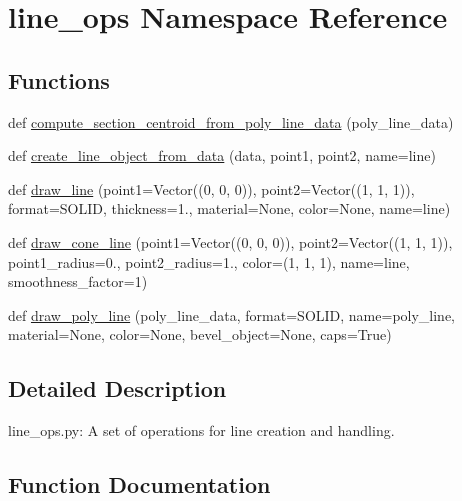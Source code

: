 \hypertarget{namespaceline__ops}{}\section{line\+\_\+ops Namespace Reference}
\label{namespaceline__ops}
\subsection*{Functions}
\begin{DoxyCompactItemize}
\item 
def \hyperlink{namespaceline__ops_a1c1e6d2c47476f9e0f4efad0660ca32c}{compute\+\_\+section\+\_\+centroid\+\_\+from\+\_\+poly\+\_\+line\+\_\+data} (poly\+\_\+line\+\_\+data)
\item 
def \hyperlink{namespaceline__ops_aa28100a7aaa999c79143eef61d9f04e3}{create\+\_\+line\+\_\+object\+\_\+from\+\_\+data} (data, point1, point2, name=\textquotesingle{}line\textquotesingle{})
\item 
def \hyperlink{namespaceline__ops_aaffad18467b48ace39bf92fa9a7ff2ce}{draw\+\_\+line} (point1=Vector((0, 0, 0)), point2=Vector((1, 1, 1)), format=\textquotesingle{}S\+O\+L\+ID\textquotesingle{}, thickness=1., material=None, color=None, name=\textquotesingle{}line\textquotesingle{})
\item 
def \hyperlink{namespaceline__ops_af11269b33e46b7eb141d9583e75001eb}{draw\+\_\+cone\+\_\+line} (point1=Vector((0, 0, 0)), point2=Vector((1, 1, 1)), point1\+\_\+radius=0., point2\+\_\+radius=1., color=(1, 1, 1), name=\textquotesingle{}line\textquotesingle{}, smoothness\+\_\+factor=1)
\item 
def \hyperlink{namespaceline__ops_aab5a8673f145eb5e729faeb5d0b0a521}{draw\+\_\+poly\+\_\+line} (poly\+\_\+line\+\_\+data, format=\textquotesingle{}S\+O\+L\+ID\textquotesingle{}, name=\textquotesingle{}poly\+\_\+line\textquotesingle{}, material=None, color=None, bevel\+\_\+object=None, caps=True)
\end{DoxyCompactItemize}


\subsection{Detailed Description}
\begin{DoxyVerb}line_ops.py:
    A set of operations for line creation and handling.
\end{DoxyVerb}
 

\subsection{Function Documentation}
